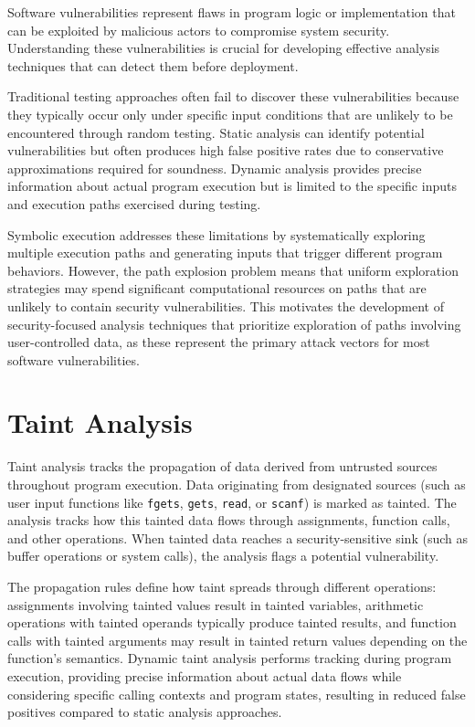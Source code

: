 Software vulnerabilities represent flaws in program logic or implementation that can be exploited by malicious actors to compromise system security. Understanding these vulnerabilities is crucial for developing effective analysis techniques that can detect them before deployment.

Traditional testing approaches often fail to discover these vulnerabilities because they typically occur only under specific input conditions that are unlikely to be encountered through random testing. Static analysis can identify potential vulnerabilities but often produces high false positive rates due to conservative approximations required for soundness. Dynamic analysis provides precise information about actual program execution but is limited to the specific inputs and execution paths exercised during testing.

Symbolic execution addresses these limitations by systematically exploring multiple execution paths and generating inputs that trigger different program behaviors. However, the path explosion problem means that uniform exploration strategies may spend significant computational resources on paths that are unlikely to contain security vulnerabilities. This motivates the development of security-focused analysis techniques that prioritize exploration of paths involving user-controlled data, as these represent the primary attack vectors for most software vulnerabilities.

\section{Taint Analysis}

Taint analysis tracks the propagation of data derived from untrusted sources throughout program execution. Data originating from designated sources (such as user input functions like \texttt{fgets}, \texttt{gets}, \texttt{read}, or \texttt{scanf}) is marked as tainted. The analysis tracks how this tainted data flows through assignments, function calls, and other operations. When tainted data reaches a security-sensitive sink (such as buffer operations or system calls), the analysis flags a potential vulnerability.

The propagation rules define how taint spreads through different operations: assignments involving tainted values result in tainted variables, arithmetic operations with tainted operands typically produce tainted results, and function calls with tainted arguments may result in tainted return values depending on the function's semantics. Dynamic taint analysis performs tracking during program execution, providing precise information about actual data flows while considering specific calling contexts and program states, resulting in reduced false positives compared to static analysis approaches.

